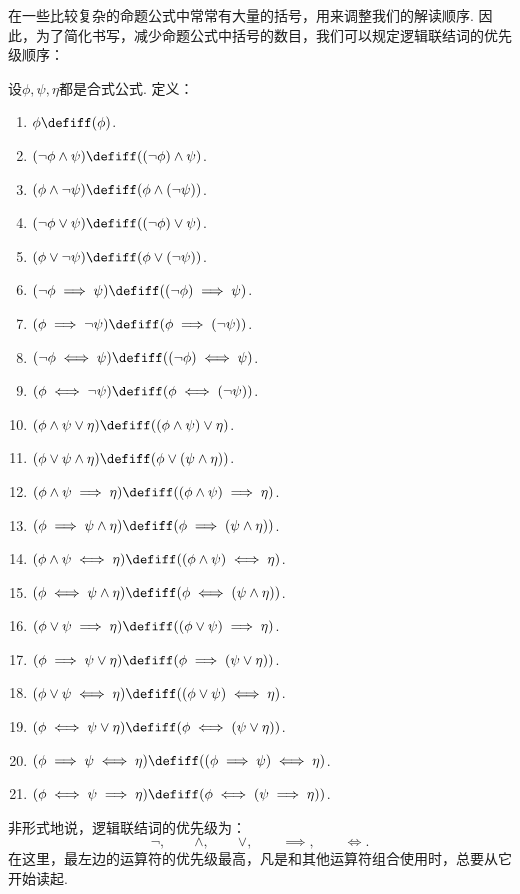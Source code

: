 在一些比较复杂的命题公式中常常有大量的括号，用来调整我们的解读顺序.
因此，为了简化书写，减少命题公式中括号的数目，我们可以规定逻辑联结词的优先级顺序：
\begin{definition}
设\(\phi,\psi,\eta\)都是合式公式.
定义：
\begin{enumerate}
	\item \(\phi
	\defiff
	(\phi)\).
	\item \((\neg\phi\land\psi)
	\defiff
	((\neg\phi)\land\psi)\).
	\item \((\phi\land\neg\psi)
	\defiff
	(\phi\land(\neg\psi))\).
	\item \((\neg\phi\lor\psi)
	\defiff
	((\neg\phi)\lor\psi)\).
	\item \((\phi\lor\neg\psi)
	\defiff
	(\phi\lor(\neg\psi))\).
	\item \((\neg\phi\implies\psi)
	\defiff
	((\neg\phi)\implies\psi)\).
	\item \((\phi\implies\neg\psi)
	\defiff
	(\phi\implies(\neg\psi))\).
	\item \((\neg\phi\iff\psi)
	\defiff
	((\neg\phi)\iff\psi)\).
	\item \((\phi\iff\neg\psi)
	\defiff
	(\phi\iff(\neg\psi))\).
	\item \((\phi\land\psi\lor\eta)
	\defiff
	((\phi\land\psi)\lor\eta)\).
	\item \((\phi\lor\psi\land\eta)
	\defiff
	(\phi\lor(\psi\land\eta))\).
	\item \((\phi\land\psi\implies\eta)
	\defiff
	((\phi\land\psi)\implies\eta)\).
	\item \((\phi\implies\psi\land\eta)
	\defiff
	(\phi\implies(\psi\land\eta))\).
	\item \((\phi\land\psi\iff\eta)
	\defiff
	((\phi\land\psi)\iff\eta)\).
	\item \((\phi\iff\psi\land\eta)
	\defiff
	(\phi\iff(\psi\land\eta))\).
	\item \((\phi\lor\psi\implies\eta)
	\defiff
	((\phi\lor\psi)\implies\eta)\).
	\item \((\phi\implies\psi\lor\eta)
	\defiff
	(\phi\implies(\psi\lor\eta))\).
	\item \((\phi\lor\psi\iff\eta)
	\defiff
	((\phi\lor\psi)\iff\eta)\).
	\item \((\phi\iff\psi\lor\eta)
	\defiff
	(\phi\iff(\psi\lor\eta))\).
	\item \((\phi\implies\psi\iff\eta)
	\defiff
	((\phi\implies\psi)\iff\eta)\).
	\item \((\phi\iff\psi\implies\eta)
	\defiff
	(\phi\iff(\psi\implies\eta))\).
\end{enumerate}
\end{definition}
非形式地说，逻辑联结词的优先级为：\[
	\neg, \qquad
	\land, \qquad
	\lor, \qquad
	\implies, \qquad
	\iff.
\]
在这里，最左边的运算符的优先级最高，凡是和其他运算符组合使用时，总要从它开始读起.

